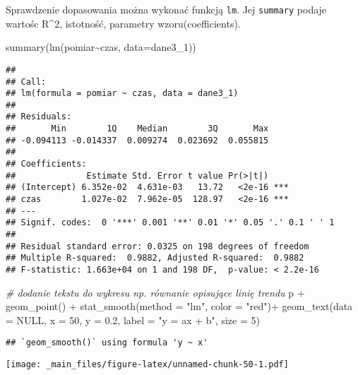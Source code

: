 \documentclass[
]{book}
\newenvironment{Shaded}{\begin{snugshade}}{\end{snugshade}}
\newcommand{\AttributeTok}[1]{\textcolor[rgb]{0.77,0.63,0.00}{#1}}
\newcommand{\CommentTok}[1]{\textcolor[rgb]{0.56,0.35,0.01}{\textit{#1}}}
\newcommand{\ConstantTok}[1]{\textcolor[rgb]{0.00,0.00,0.00}{#1}}
\newcommand{\DecValTok}[1]{\textcolor[rgb]{0.00,0.00,0.81}{#1}}
\newcommand{\FloatTok}[1]{\textcolor[rgb]{0.00,0.00,0.81}{#1}}
\newcommand{\FunctionTok}[1]{\textcolor[rgb]{0.00,0.00,0.00}{#1}}
\newcommand{\NormalTok}[1]{#1}
\newcommand{\SpecialCharTok}[1]{\textcolor[rgb]{0.00,0.00,0.00}{#1}}
\newcommand{\StringTok}[1]{\textcolor[rgb]{0.31,0.60,0.02}{#1}}
\begin{document}
Sprawdzenie dopasowania można wykonać funkcją \texttt{lm}. Jej \texttt{summary} podaje wartośc R\^{}2, istotność, parametry wzoru(coefficients).

\begin{Shaded}
\begin{Highlighting}[]
\FunctionTok{summary}\NormalTok{(}\FunctionTok{lm}\NormalTok{(pomiar}\SpecialCharTok{\textasciitilde{}}\NormalTok{czas, }\AttributeTok{data=}\NormalTok{dane3\_1))}
\end{Highlighting}
\end{Shaded}

\begin{verbatim}
## 
## Call:
## lm(formula = pomiar ~ czas, data = dane3_1)
## 
## Residuals:
##       Min        1Q    Median        3Q       Max 
## -0.094113 -0.014337  0.009274  0.023692  0.055815 
## 
## Coefficients:
##              Estimate Std. Error t value Pr(>|t|)    
## (Intercept) 6.352e-02  4.631e-03   13.72   <2e-16 ***
## czas        1.027e-02  7.962e-05  128.97   <2e-16 ***
## ---
## Signif. codes:  0 '***' 0.001 '**' 0.01 '*' 0.05 '.' 0.1 ' ' 1
## 
## Residual standard error: 0.0325 on 198 degrees of freedom
## Multiple R-squared:  0.9882, Adjusted R-squared:  0.9882 
## F-statistic: 1.663e+04 on 1 and 198 DF,  p-value: < 2.2e-16
\end{verbatim}

\begin{Shaded}
\begin{Highlighting}[]
\CommentTok{\# dodanie tekstu do wykresu np. równanie opisujące linię trendu}
\NormalTok{p }\SpecialCharTok{+} \FunctionTok{geom\_point}\NormalTok{() }\SpecialCharTok{+} \FunctionTok{stat\_smooth}\NormalTok{(}\AttributeTok{method =} \StringTok{"lm"}\NormalTok{, }\AttributeTok{color =} \StringTok{"red"}\NormalTok{)}\SpecialCharTok{+}
  \FunctionTok{geom\_text}\NormalTok{(}\AttributeTok{data =} \ConstantTok{NULL}\NormalTok{, }\AttributeTok{x =} \DecValTok{50}\NormalTok{, }\AttributeTok{y =} \FloatTok{0.2}\NormalTok{, }\AttributeTok{label =} \StringTok{"y = ax + b"}\NormalTok{, }\AttributeTok{size =} \DecValTok{5}\NormalTok{)}
\end{Highlighting}
\end{Shaded}

\begin{verbatim}
## `geom_smooth()` using formula 'y ~ x'
\end{verbatim}

\texttt{[image: \_main\_files/figure-latex/unnamed-chunk-50-1.pdf]}
\end{document}
